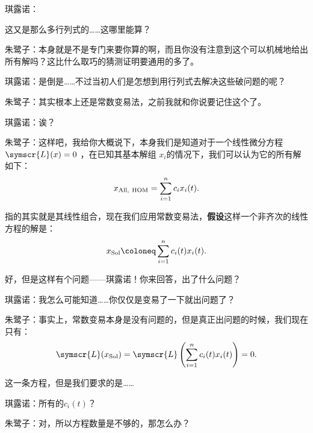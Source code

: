 琪露诺：


这又是那么多行列式的……这哪里能算？

朱鹭子：本身就是不是专门来要你算的啊，而且你没有注意到这个可以机械地给出所有解吗？这比什么取巧的猜测证明要通用的多了。

琪露诺：是倒是……不过当初人们是怎想到用行列式去解决这些破问题的呢？

朱鹭子：其实根本上还是常数变易法，之前我就和你说要记住这个了。

琪露诺：诶？

朱鹭子：这样吧，我给你大概说下，本身我们是知道对于一个线性微分方程 \(\symscr{L} (x)=0\) ，在已知其基本解组 \(x_i\)的情况下，我们可以认为它的所有解如下：
\[
	x_{\rm All,\ HOM} = \sum_{i=1}^{n} c_i x_i(t)
	.\]

指的其实就是其线性组合，现在我们应用常数变易法，\textbf{假设}这样一个非齐次的线性方程的解是：
\[
	x_{\rm Sol} \coloneq \sum_{i=1}^{n} c_i(t) x_i(t)
	.\]

好，但是这样有个问题——琪露诺！你来回答，出了什么问题？

琪露诺：我怎么可能知道……你仅仅是变易了一下就出问题了？

朱鹭子：事实上，常数变易本身是没有问题的，但是真正出问题的时候，我们现在只有：
\[
	\symscr{L} (x_{\rm Sol}) = \symscr{L} \left( \sum_{i=1}^{n} c_i(t)x_i(t) \right) =0
	.\]

这一条方程，但是我们要求的是……

琪露诺：所有的\(c_i(t)\)？

朱鹭子：对，所以方程数量是不够的，那怎么办？

